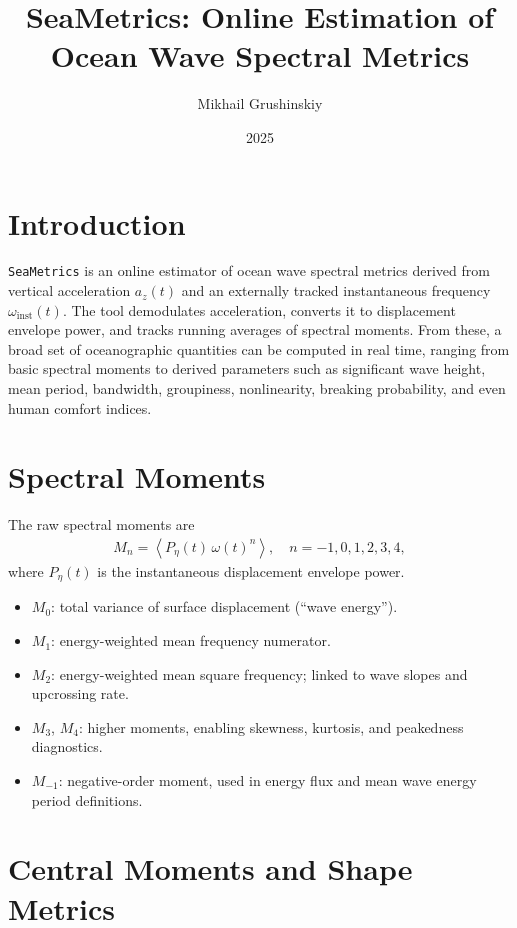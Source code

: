 \documentclass[11pt]{article}
\title{SeaMetrics: Online Estimation of Ocean Wave Spectral Metrics}
\author{Mikhail Grushinskiy}
\date{2025}
\begin{document}
\maketitle

\section{Introduction}

\texttt{SeaMetrics} is an online estimator of ocean wave spectral metrics
derived from vertical acceleration $a_z(t)$ and an externally tracked instantaneous frequency $\omega_{\text{inst}}(t)$.  
The tool demodulates acceleration, converts it to displacement envelope power, and tracks
running averages of spectral moments.  
From these, a broad set of oceanographic quantities can be computed in real time, ranging from
basic spectral moments to derived parameters such as significant wave height, mean period,
bandwidth, groupiness, nonlinearity, breaking probability, and even human comfort indices.

\section{Spectral Moments}

The raw spectral moments are
\begin{align}
M_n = \left\langle P_{\eta}(t)\,\omega(t)^n \right\rangle, \quad n = -1,0,1,2,3,4,
\end{align}
where $P_{\eta}(t)$ is the instantaneous displacement envelope power.  

\begin{itemize}
  \item $M_0$: total variance of surface displacement (``wave energy'').
  \item $M_1$: energy-weighted mean frequency numerator.
  \item $M_2$: energy-weighted mean square frequency; linked to wave slopes and upcrossing rate.
  \item $M_3$, $M_4$: higher moments, enabling skewness, kurtosis, and peakedness diagnostics.
  \item $M_{-1}$: negative-order moment, used in energy flux and mean wave energy period definitions.
\end{itemize}

\section{Central Moments and Shape Metrics}
\end{document}
